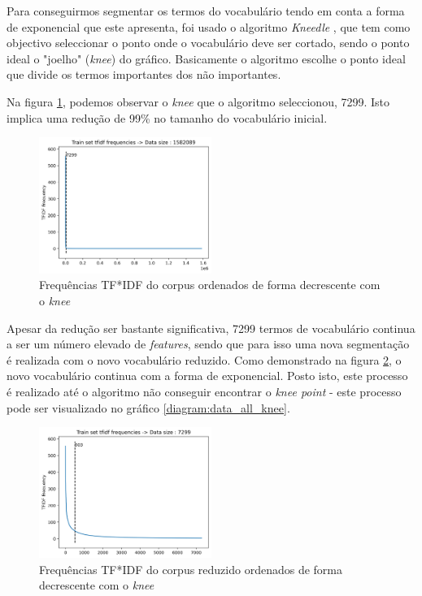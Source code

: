 \begin{enumerate}
Para conseguirmos segmentar os termos do vocabulário tendo em conta a forma de exponencial que este apresenta, foi usado o algoritmo \textit{Kneedle} \cite{Kneedle}, que tem como objectivo seleccionar o ponto onde o vocabulário deve ser cortado, sendo o ponto ideal o "joelho" (\textit{knee}) do gráfico. Basicamente o algoritmo escolhe o ponto ideal que divide os termos importantes dos não importantes.

Na figura \ref{diagram:data_knee}, podemos observar o \textit{knee} que o algoritmo seleccionou, 7299. Isto implica uma redução de 99\% no tamanho do vocabulário inicial. 

\begin{figure}[t]
\begin{center}
\includegraphics[width=0.5\textwidth,keepaspectratio]{figures/data_knee.png}
\caption{Frequências TF*IDF do corpus ordenados de forma decrescente com o \textit{knee}}
\label{diagram:data_knee}
\centering
\end{center}
\end{figure}

Apesar da redução ser bastante significativa, 7299 termos de vocabulário continua a ser um número elevado de \textit{features}, sendo que para isso uma nova segmentação é realizada com o novo vocabulário reduzido. Como demonstrado na figura \ref{diagram:data_second_knee},  o novo vocabulário continua com a forma de exponencial. Posto isto, este processo é realizado até o algoritmo não conseguir encontrar o \textit{knee point} - este processo pode ser visualizado no gráfico \ref{diagram:data_all_knee}.

\begin{figure}[t]
\begin{center}
\includegraphics[width=0.5\textwidth,keepaspectratio]{figures/data_size_503.png}
\caption{Frequências TF*IDF do corpus reduzido ordenados de forma decrescente com o \textit{knee}}
\label{diagram:data_second_knee}
\centering
\end{center}
\end{figure}


\end{enumerate}
